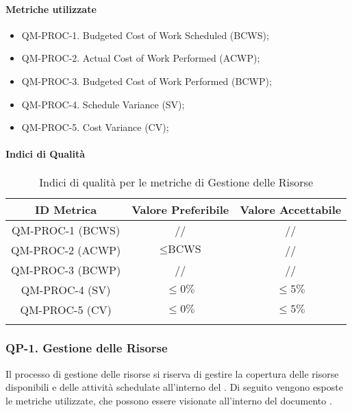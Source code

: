 		\paragraph{Metriche utilizzate}

			\begin{itemize}
				\item QM-PROC-1. Budgeted Cost of Work Scheduled (BCWS);
				\item QM-PROC-2. Actual Cost of Work Performed (ACWP);
				\item QM-PROC-3. Budgeted Cost of Work Performed (BCWP);
				\item QM-PROC-4. Schedule Variance (SV);
				\item QM-PROC-5. Cost Variance (CV);
			\end{itemize}

		\paragraph{Indici di Qualità}

			\begin{center}
				\begin{longtable}{|c|c|c|}
				\hline
				\rowcolor{lighter-grayer}
				\textbf{ID Metrica} & \textbf{Valore Preferibile} & \textbf{Valore Accettabile}\\
				\hline
				\endfirsthead
				\hline
				QM-PROC-1 (BCWS) & // & // \\
				\hline
				QM-PROC-2 (ACWP) & \( \le \text{BCWS}\) & // \\
				\hline
				QM-PROC-3 (BCWP) & // & // \\
				\hline
				QM-PROC-4 (SV) & \(\le 0\%\) & \(\le 5\%\) \\
				\hline
				QM-PROC-5 (CV) & \(\le 0\%\) & \(\le 5\%\) \\
				\hline
				\caption{Indici di qualità per le metriche di Gestione delle Risorse}
				\end{longtable}
			\end{center}
			

	\subsubsection{QP-1. Gestione delle Risorse}

		Il processo di gestione delle risorse si riserva di gestire la copertura delle risorse disponibili e delle attività schedulate all'interno del . Di seguito vengono esposte le metriche utilizzate, che possono essere visionate all'interno del documento . 

